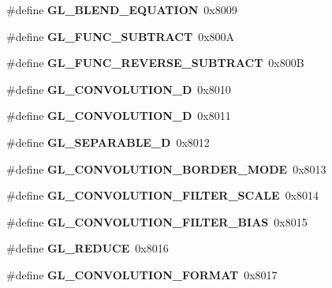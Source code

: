 \begin{DoxyCompactItemize}
\item 
\#define {\bfseries G\+L\+\_\+\+B\+L\+E\+N\+D\+\_\+\+E\+Q\+U\+A\+T\+I\+O\+N}~0x8009\label{_s_d_l__opengl_8h_a2e51c4b0c223640236a52fb26503874b}

\item 
\#define {\bfseries G\+L\+\_\+\+F\+U\+N\+C\+\_\+\+S\+U\+B\+T\+R\+A\+C\+T}~0x800\+A\label{_s_d_l__opengl_8h_ad0017e5c11a6be44b705d87053607fca}

\item 
\#define {\bfseries G\+L\+\_\+\+F\+U\+N\+C\+\_\+\+R\+E\+V\+E\+R\+S\+E\+\_\+\+S\+U\+B\+T\+R\+A\+C\+T}~0x800\+B\label{_s_d_l__opengl_8h_a8439350af7b66d0115f23d27a6511917}

\item 
\#define {\bfseries G\+L\+\_\+\+C\+O\+N\+V\+O\+L\+U\+T\+I\+O\+N\+\_\+D}~0x8010\label{_s_d_l__opengl_8h_aada4e8aa2327463487b11db0a8dee20a}

\item 
\#define {\bfseries G\+L\+\_\+\+C\+O\+N\+V\+O\+L\+U\+T\+I\+O\+N\+\_\+D}~0x8011\label{_s_d_l__opengl_8h_ab6596a0c07d03c03ad72b6406b8fa0da}

\item 
\#define {\bfseries G\+L\+\_\+\+S\+E\+P\+A\+R\+A\+B\+L\+E\+\_\+D}~0x8012\label{_s_d_l__opengl_8h_ae62aef209252ace8373e8aa83fd44eac}

\item 
\#define {\bfseries G\+L\+\_\+\+C\+O\+N\+V\+O\+L\+U\+T\+I\+O\+N\+\_\+\+B\+O\+R\+D\+E\+R\+\_\+\+M\+O\+D\+E}~0x8013\label{_s_d_l__opengl_8h_a927d3aa8df6dcd426be75032bdc8620b}

\item 
\#define {\bfseries G\+L\+\_\+\+C\+O\+N\+V\+O\+L\+U\+T\+I\+O\+N\+\_\+\+F\+I\+L\+T\+E\+R\+\_\+\+S\+C\+A\+L\+E}~0x8014\label{_s_d_l__opengl_8h_a540318e98b09af62428147cceff01d37}

\item 
\#define {\bfseries G\+L\+\_\+\+C\+O\+N\+V\+O\+L\+U\+T\+I\+O\+N\+\_\+\+F\+I\+L\+T\+E\+R\+\_\+\+B\+I\+A\+S}~0x8015\label{_s_d_l__opengl_8h_a8604966237a6b79980b06c249b02f968}

\item 
\#define {\bfseries G\+L\+\_\+\+R\+E\+D\+U\+C\+E}~0x8016\label{_s_d_l__opengl_8h_a1dbc0286954509fbecea26fb49347c0e}

\item 
\#define {\bfseries G\+L\+\_\+\+C\+O\+N\+V\+O\+L\+U\+T\+I\+O\+N\+\_\+\+F\+O\+R\+M\+A\+T}~0x8017\label{_s_d_l__opengl_8h_a9c7222b9262e32c7b0cf406277c13f40}


\end{DoxyCompactItemize}
